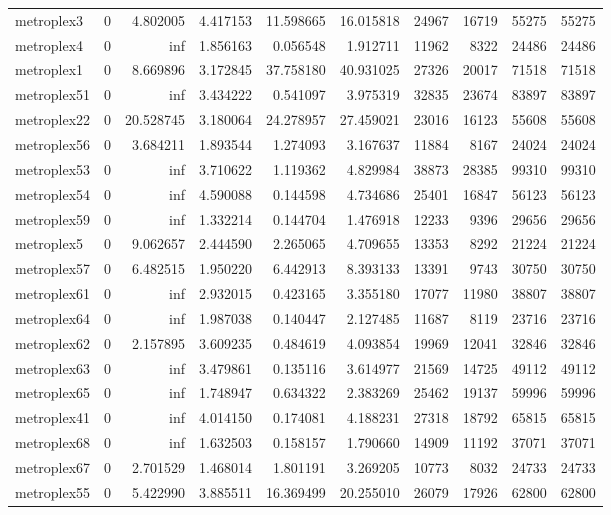 \begin{longtable}{|l|r|r|r|r|r|r|r|r|r|}
metroplex3 & 0 & 4.802005 & 4.417153 & 11.598665 & 16.015818 & 24967 & 16719 & 55275 & 55275 \\
metroplex4 & 0 & inf & 1.856163 & 0.056548 & 1.912711 & 11962 & 8322 & 24486 & 24486 \\
metroplex1 & 0 & 8.669896 & 3.172845 & 37.758180 & 40.931025 & 27326 & 20017 & 71518 & 71518 \\
metroplex51 & 0 & inf & 3.434222 & 0.541097 & 3.975319 & 32835 & 23674 & 83897 & 83897 \\
metroplex22 & 0 & 20.528745 & 3.180064 & 24.278957 & 27.459021 & 23016 & 16123 & 55608 & 55608 \\
metroplex56 & 0 & 3.684211 & 1.893544 & 1.274093 & 3.167637 & 11884 & 8167 & 24024 & 24024 \\
metroplex53 & 0 & inf & 3.710622 & 1.119362 & 4.829984 & 38873 & 28385 & 99310 & 99310 \\
metroplex54 & 0 & inf & 4.590088 & 0.144598 & 4.734686 & 25401 & 16847 & 56123 & 56123 \\
metroplex59 & 0 & inf & 1.332214 & 0.144704 & 1.476918 & 12233 & 9396 & 29656 & 29656 \\
metroplex5 & 0 & 9.062657 & 2.444590 & 2.265065 & 4.709655 & 13353 & 8292 & 21224 & 21224 \\
metroplex57 & 0 & 6.482515 & 1.950220 & 6.442913 & 8.393133 & 13391 & 9743 & 30750 & 30750 \\
metroplex61 & 0 & inf & 2.932015 & 0.423165 & 3.355180 & 17077 & 11980 & 38807 & 38807 \\
metroplex64 & 0 & inf & 1.987038 & 0.140447 & 2.127485 & 11687 & 8119 & 23716 & 23716 \\
metroplex62 & 0 & 2.157895 & 3.609235 & 0.484619 & 4.093854 & 19969 & 12041 & 32846 & 32846 \\
metroplex63 & 0 & inf & 3.479861 & 0.135116 & 3.614977 & 21569 & 14725 & 49112 & 49112 \\
metroplex65 & 0 & inf & 1.748947 & 0.634322 & 2.383269 & 25462 & 19137 & 59996 & 59996 \\
metroplex41 & 0 & inf & 4.014150 & 0.174081 & 4.188231 & 27318 & 18792 & 65815 & 65815 \\
metroplex68 & 0 & inf & 1.632503 & 0.158157 & 1.790660 & 14909 & 11192 & 37071 & 37071 \\
metroplex67 & 0 & 2.701529 & 1.468014 & 1.801191 & 3.269205 & 10773 & 8032 & 24733 & 24733 \\
metroplex55 & 0 & 5.422990 & 3.885511 & 16.369499 & 20.255010 & 26079 & 17926 & 62800 & 62800 \\

\end{longtable}
